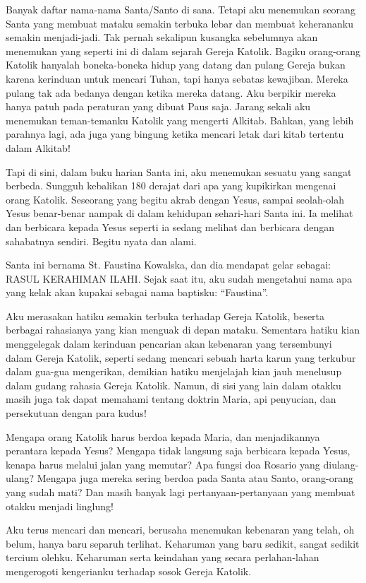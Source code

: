 Banyak daftar nama-nama Santa/Santo di sana. Tetapi aku menemukan seorang Santa yang membuat mataku semakin terbuka lebar dan membuat keherananku semakin menjadi-jadi. Tak pernah sekalipun kusangka sebelumnya akan menemukan yang seperti ini di dalam sejarah Gereja Katolik. Bagiku orang-orang Katolik hanyalah boneka-boneka hidup yang datang dan pulang Gereja bukan karena kerinduan untuk mencari Tuhan, tapi hanya sebatas kewajiban. Mereka pulang tak ada bedanya dengan ketika mereka datang. Aku berpikir mereka hanya patuh pada peraturan yang dibuat Paus saja. Jarang sekali aku menemukan teman-temanku Katolik yang mengerti Alkitab. Bahkan, yang lebih parahnya lagi, ada juga yang bingung ketika mencari letak dari kitab tertentu dalam Alkitab!

Tapi di sini, dalam buku harian Santa ini, aku menemukan sesuatu yang sangat berbeda. Sungguh kebalikan 180 derajat dari apa yang kupikirkan mengenai orang Katolik. Seseorang yang begitu akrab dengan Yesus, sampai seolah-olah Yesus benar-benar nampak di dalam kehidupan sehari-hari Santa ini. Ia melihat dan berbicara kepada Yesus seperti ia sedang melihat dan berbicara dengan sahabatnya sendiri. Begitu nyata dan alami.

Santa ini bernama St. Faustina Kowalska, dan dia mendapat gelar sebagai: RASUL KERAHIMAN ILAHI.
Sejak saat itu, aku sudah mengetahui nama apa yang kelak akan kupakai sebagai nama baptisku: “Faustina”.

Aku merasakan hatiku semakin terbuka terhadap Gereja Katolik, beserta berbagai rahasianya yang kian menguak di depan mataku. Sementara hatiku kian menggelegak dalam kerinduan pencarian akan kebenaran yang tersembunyi dalam Gereja Katolik, seperti sedang mencari sebuah harta karun yang terkubur dalam gua-gua mengerikan, demikian hatiku menjelajah kian jauh menelusup dalam gudang rahasia Gereja Katolik. Namun, di sisi yang lain dalam otakku masih juga tak dapat memahami tentang doktrin Maria, api penyucian, dan persekutuan dengan para kudus!

Mengapa orang Katolik harus berdoa kepada Maria, dan menjadikannya perantara kepada Yesus? Mengapa tidak langsung saja berbicara kepada Yesus, kenapa harus melalui jalan yang memutar? Apa fungsi doa Rosario yang diulang-ulang? Mengapa juga mereka sering berdoa pada Santa atau Santo, orang-orang yang sudah mati? Dan masih banyak lagi pertanyaan-pertanyaan yang membuat otakku menjadi linglung!

Aku terus mencari dan mencari, berusaha menemukan kebenaran yang telah, oh belum, hanya baru separuh terlihat. Keharuman yang baru sedikit, sangat sedikit tercium olehku. Keharuman serta keindahan yang secara perlahan-lahan mengerogoti kengerianku terhadap sosok Gereja Katolik.

